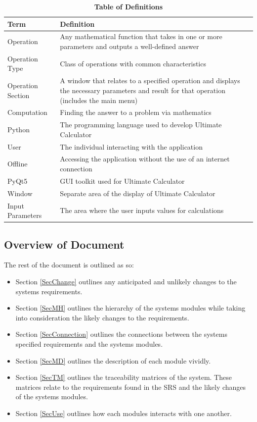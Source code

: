 \documentclass[12pt, titlepage]{article}
\begin{document}
\begin{table}[H]
\caption{\textbf{Table of Definitions}} \label{Table}

\begin{tabularx}{\textwidth}{p{3cm}X}
\toprule
\textbf{Term} & \textbf{Definition}\\
\midrule
Operation & Any mathematical function that takes in one or more parameters and
outputs a well-defined answer\\
Operation Type & Class of operations with common characteristics\\
Operation Section & A window that relates to a specified operation and displays the
necessary parameters and result for that operation (includes the main menu)\\
Computation & Finding the answer to a problem via mathematics\\
Python & The programming language used to develop Ultimate Calculator\\
User & The individual interacting with the application\\
Offline & Accessing the application without the use of an internet connection\\
PyQt5 & GUI toolkit used for Ultimate Calculator\\
Window & Separate area of the display of Ultimate Calculator\\
Input Parameters & The area where the user inputs values for calculations\\
\bottomrule
\end{tabularx}

\end{table}


\subsection{Overview of Document}
The rest of the document is outlined as so:
\begin{itemize}
    \item Section \ref{SecChange} outlines any anticipated and unlikely changes to the systems requirements.
    \item Section \ref{SecMH} outlines the hierarchy of the systems modules while taking into consideration the likely changes to the requirements. 
    \item Section \ref{SecConnection} outlines the connections between the systems specified requirements and the systems modules.
    \item Section \ref{SecMD} outlines the description of each module vividly.
    \item Section \ref{SecTM} outlines the traceability matrices of the system. These matrices relate to the requirements found in the SRS and the likely changes of the systems modules.
    \item Section \ref{SecUse} outlines how each modules interacts with one another.
\end{itemize}
\end{document}
